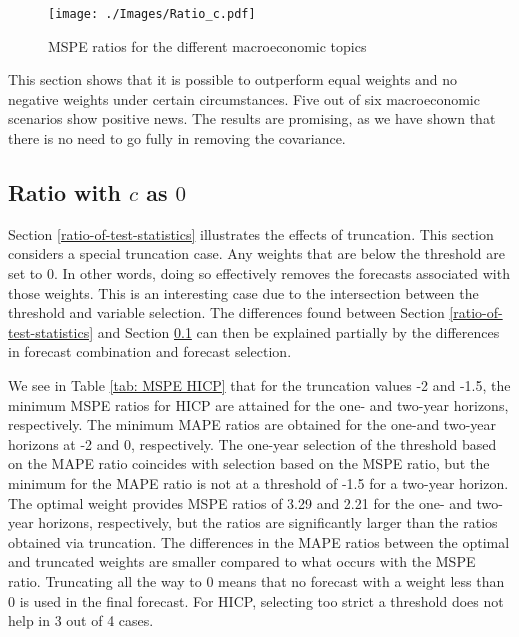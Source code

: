 \documentclass[11pt]{article}
\begin{document}
	\begin{figure}[!h]
		\centering
		\texttt{[image: ./Images/Ratio\_c.pdf]}
		\caption{MSPE ratios for the different macroeconomic topics}\label{fig: c Ratio sub}
	\end{figure}
	
	This section shows that it is possible to outperform equal weights and no negative weights under certain circumstances. Five out of six macroeconomic scenarios show positive news. The results are promising, as we have shown that there is no need to go fully in removing the covariance.
	
	\subsection{Ratio with $c$ as $0$}\label{ratio-of-mean-squared-prediction-error}
	Section \ref{ratio-of-test-statistics} illustrates the effects of truncation. This section considers a special truncation case. Any weights that are below the threshold are set to $0$. In other words, doing so effectively removes the forecasts associated with those weights. This is an interesting case due to the intersection between the threshold and variable selection. The differences found between Section \ref{ratio-of-test-statistics} and Section \ref{ratio-of-mean-squared-prediction-error} can then be explained partially by the differences in forecast combination and forecast selection.
	
	We see in Table \ref{tab: MSPE HICP} that for the truncation values -2 and -1.5, the minimum MSPE ratios for HICP are attained for the one- and two-year horizons, respectively. The minimum MAPE ratios are obtained for the one-and two-year horizons at -2 and 0, respectively. The one-year selection of the threshold based on the MAPE ratio coincides with selection based on the MSPE ratio, but the minimum for the MAPE ratio is not at a threshold of -1.5 for a two-year horizon. The optimal weight provides MSPE ratios of 3.29 and 2.21 for the one- and two-year horizons, respectively, but the ratios are significantly larger than the ratios obtained via truncation. The differences in the MAPE ratios between  the optimal and truncated weights are smaller compared to what occurs with the MSPE ratio. Truncating all the way to 0 means that no forecast with a weight less than 0 is used in the final forecast. For HICP, selecting too strict a threshold does not help in 3 out of 4 cases.
	
\end{document}
